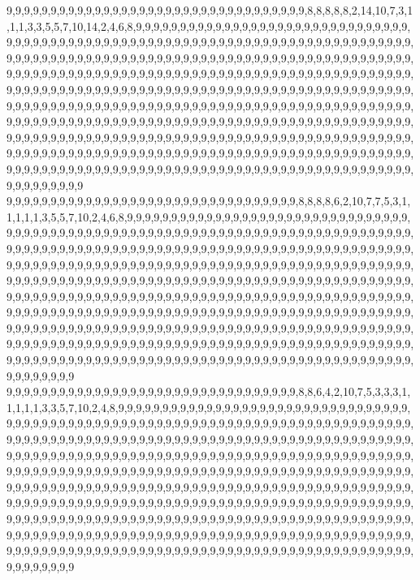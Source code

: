 9,9,9,9,9,9,9,9,9,9,9,9,9,9,9,9,9,9,9,9,9,9,9,9,9,9,9,9,9,9,9,9,9,9,8,8,8,8,8,2,14,10,7,3,1,1,1,3,3,5,5,7,10,14,2,4,6,8,9,9,9,9,9,9,9,9,9,9,9,9,9,9,9,9,9,9,9,9,9,9,9,9,9,9,9,9,9,9,9,9,9,9,9,9,9,9,9,9,9,9,9,9,9,9,9,9,9,9,9,9,9,9,9,9,9,9,9,9,9,9,9,9,9,9,9,9,9,9,9,9,9,9,9,9,9,9,9,9,9,9,9,9,9,9,9,9,9,9,9,9,9,9,9,9,9,9,9,9,9,9,9,9,9,9,9,9,9,9,9,9,9,9,9,9,9,9,9,9,9,9,9,9,9,9,9,9,9,9,9,9,9,9,9,9,9,9,9,9,9,9,9,9,9,9,9,9,9,9,9,9,9,9,9,9,9,9,9,9,9,9,9,9,9,9,9,9,9,9,9,9,9,9,9,9,9,9,9,9,9,9,9,9,9,9,9,9,9,9,9,9,9,9,9,9,9,9,9,9,9,9,9,9,9,9,9,9,9,9,9,9,9,9,9,9,9,9,9,9,9,9,9,9,9,9,9,9,9,9,9,9,9,9,9,9,9,9,9,9,9,9,9,9,9,9,9,9,9,9,9,9,9,9,9,9,9,9,9,9,9,9,9,9,9,9,9,9,9,9,9,9,9,9,9,9,9,9,9,9,9,9,9,9,9,9,9,9,9,9,9,9,9,9,9,9,9,9,9,9,9,9,9,9,9,9,9,9,9,9,9,9,9,9,9,9,9,9,9,9,9,9,9,9,9,9,9,9,9,9,9,9,9,9,9,9,9,9,9,9,9,9,9,9,9,9,9,9,9,9,9,9,9,9,9,9,9,9,9,9,9,9,9,9,9,9,9,9,9,9,9,9,9,9,9,9,9,9,9,9,9,9,9,9,9,9,9,9,9,9,9,9,9,9,9,9,9,9,9,9,9,9,9,9,9,9,9,9,9,9,9,9,9,9,9,9,9,9,9,9,9,9,9,9,9,9,9,9,9,9,9,9,9,9,9,9,9,9,9,9,9,9,9,9,9,9,9,9,9,9,9,9,9,9
9,9,9,9,9,9,9,9,9,9,9,9,9,9,9,9,9,9,9,9,9,9,9,9,9,9,9,9,9,9,9,9,9,8,8,8,8,6,2,10,7,7,5,3,1,1,1,1,1,3,5,5,7,10,2,4,6,8,9,9,9,9,9,9,9,9,9,9,9,9,9,9,9,9,9,9,9,9,9,9,9,9,9,9,9,9,9,9,9,9,9,9,9,9,9,9,9,9,9,9,9,9,9,9,9,9,9,9,9,9,9,9,9,9,9,9,9,9,9,9,9,9,9,9,9,9,9,9,9,9,9,9,9,9,9,9,9,9,9,9,9,9,9,9,9,9,9,9,9,9,9,9,9,9,9,9,9,9,9,9,9,9,9,9,9,9,9,9,9,9,9,9,9,9,9,9,9,9,9,9,9,9,9,9,9,9,9,9,9,9,9,9,9,9,9,9,9,9,9,9,9,9,9,9,9,9,9,9,9,9,9,9,9,9,9,9,9,9,9,9,9,9,9,9,9,9,9,9,9,9,9,9,9,9,9,9,9,9,9,9,9,9,9,9,9,9,9,9,9,9,9,9,9,9,9,9,9,9,9,9,9,9,9,9,9,9,9,9,9,9,9,9,9,9,9,9,9,9,9,9,9,9,9,9,9,9,9,9,9,9,9,9,9,9,9,9,9,9,9,9,9,9,9,9,9,9,9,9,9,9,9,9,9,9,9,9,9,9,9,9,9,9,9,9,9,9,9,9,9,9,9,9,9,9,9,9,9,9,9,9,9,9,9,9,9,9,9,9,9,9,9,9,9,9,9,9,9,9,9,9,9,9,9,9,9,9,9,9,9,9,9,9,9,9,9,9,9,9,9,9,9,9,9,9,9,9,9,9,9,9,9,9,9,9,9,9,9,9,9,9,9,9,9,9,9,9,9,9,9,9,9,9,9,9,9,9,9,9,9,9,9,9,9,9,9,9,9,9,9,9,9,9,9,9,9,9,9,9,9,9,9,9,9,9,9,9,9,9,9,9,9,9,9,9,9,9,9,9,9,9,9,9,9,9,9,9,9,9,9,9,9,9,9,9,9,9,9,9,9,9,9,9,9,9,9,9,9,9,9,9,9,9,9,9,9,9,9,9,9,9,9,9,9,9,9,9,9,9,9,9,9,9
9,9,9,9,9,9,9,9,9,9,9,9,9,9,9,9,9,9,9,9,9,9,9,9,9,9,9,9,9,9,9,9,9,8,8,6,4,2,10,7,5,3,3,3,1,1,1,1,1,3,3,5,7,10,2,4,8,9,9,9,9,9,9,9,9,9,9,9,9,9,9,9,9,9,9,9,9,9,9,9,9,9,9,9,9,9,9,9,9,9,9,9,9,9,9,9,9,9,9,9,9,9,9,9,9,9,9,9,9,9,9,9,9,9,9,9,9,9,9,9,9,9,9,9,9,9,9,9,9,9,9,9,9,9,9,9,9,9,9,9,9,9,9,9,9,9,9,9,9,9,9,9,9,9,9,9,9,9,9,9,9,9,9,9,9,9,9,9,9,9,9,9,9,9,9,9,9,9,9,9,9,9,9,9,9,9,9,9,9,9,9,9,9,9,9,9,9,9,9,9,9,9,9,9,9,9,9,9,9,9,9,9,9,9,9,9,9,9,9,9,9,9,9,9,9,9,9,9,9,9,9,9,9,9,9,9,9,9,9,9,9,9,9,9,9,9,9,9,9,9,9,9,9,9,9,9,9,9,9,9,9,9,9,9,9,9,9,9,9,9,9,9,9,9,9,9,9,9,9,9,9,9,9,9,9,9,9,9,9,9,9,9,9,9,9,9,9,9,9,9,9,9,9,9,9,9,9,9,9,9,9,9,9,9,9,9,9,9,9,9,9,9,9,9,9,9,9,9,9,9,9,9,9,9,9,9,9,9,9,9,9,9,9,9,9,9,9,9,9,9,9,9,9,9,9,9,9,9,9,9,9,9,9,9,9,9,9,9,9,9,9,9,9,9,9,9,9,9,9,9,9,9,9,9,9,9,9,9,9,9,9,9,9,9,9,9,9,9,9,9,9,9,9,9,9,9,9,9,9,9,9,9,9,9,9,9,9,9,9,9,9,9,9,9,9,9,9,9,9,9,9,9,9,9,9,9,9,9,9,9,9,9,9,9,9,9,9,9,9,9,9,9,9,9,9,9,9,9,9,9,9,9,9,9,9,9,9,9,9,9,9,9,9,9,9,9,9,9,9,9,9,9,9,9,9,9,9,9,9,9,9,9,9,9,9,9,9,9,9,9,9,9,9,9,9,9,9,9,9,9,9,9
